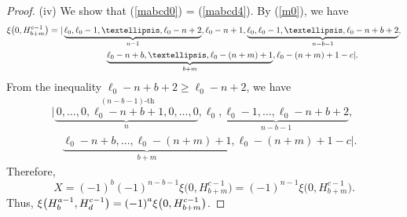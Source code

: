 \documentclass[10pt,a4paper]{amsart}
\begin{document}
\begin{proof}
(iv) We show that (\ref{mabcd0}) = (\ref{mabcd4}). By (\ref{m0}), we have
\begin{gather*}
\xi\bigl(0,H^{c-1}_{b+m}\bigr)=|\underbrace{\ell_{0},\ell_{0}-1,\dots,\ell_{0}-n+2}_{n-1}, {\ell_{0}-n+1},
\underbrace{\ell_{0},\ell_{0}-1,\dots,\ell_{0}-n+b+2}_{n-b-1},\\
\hphantom{\xi\bigl(0,H^{c-1}_{b+m}\bigr)=|}{}
\underbrace{\ell_{0}-n+b,\dots,\ell_{0}-(n+m)+1}_{b+m},\ell_{0}-(n+m)+1-c|\nonumber.
\end{gather*}
From the inequality $\ell_{0}-n+b+2\geq \ell_0-n+2$, we have
\begin{gather*}
|\underbrace{\,0,\dots,0,\stackrel{(n-b-1)\text{-th}}{\ell_{0}-n+b+1},0,\dots,0}_{n},\underbrace{\ell_{0},\ell_{0}-1,\dots,\ell_{0}-n+b+2}_{n-b-1},\\
\quad{}
\underbrace{\ell_{0}-n+b,\dots,\ell_{0}-(n+m)+1}_{b+m},\ell_{0}-(n+m)+1-c|\nonumber.
\end{gather*}
Therefore,
\[
X={(-1)}^{b}{(-1)}^{n-b-1}\xi\bigl(0,H^{c-1}_{b+m}\bigr)={(-1)}^{n-1}\xi\bigl(0,H^{c-1}_{b+m}\bigr).
\]
 Thus, $\xi\smash{\bigl(H^{a-1}_{b},H^{c-1}_{d}\bigr)}={(-1)}^{a}\xi\smash{\bigl(0,H^{c-1}_{b+m}\bigr)}$.
\end{proof}
\end{document}
